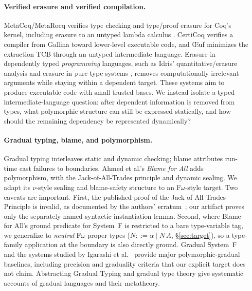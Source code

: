 \documentclass[acmsmall,anonymous=false,nonacm]{acmart}
\begin{document}
\paragraph{Verified erasure and verified compilation.}
MetaCoq/MetaRocq verifies type checking and type/proof erasure for Coq's kernel,
including erasure to an untyped lambda calculus
\cite{sozeau2020metacoq,sozeau2020coqcoqcorrect}.
CertiCoq \cite{anand2017certicoq} verifies a compiler from Gallina toward
lower-level executable code, and \OE{}uf \cite{mullen2018oeuf} minimizes the
extraction TCB through an untyped intermediate language.  Erasure in dependently
typed \emph{programming} languages, such as Idris'
quantitative/erasure analysis \cite{brady2013idris,tejiscak2020erasure} and
erasure in pure type systems \cite{mishra2008erasure}, removes computationally
irrelevant arguments while staying within a dependent target.  These systems aim
to produce executable code with small trusted bases.  We instead isolate a typed
intermediate-language question: after dependent information is removed from
types, what polymorphic structure can still be expressed statically, and how
should the remaining dependency be represented dynamically?

\paragraph{Gradual typing, blame, and polymorphism.}
Gradual typing \cite{siek2006gradual,siek2015refined} interleaves static and
dynamic checking; blame \cite{findler2002contracts,wadler2009blame} attributes
run-time cast failures to boundaries. Ahmed et al.'s \emph{Blame for All}
\cite{ahmed2011blame} adds polymorphism, with the Jack-of-All-Trades principle
and dynamic sealing. We adapt its $\nu$-style sealing and
blame-safety structure to an F$\omega$-style target.  Two caveats are important.
First, the published proof of the Jack-of-All-Trades Principle is invalid, as
documented by the authors' erratum~\cite{ahmed2011blameerratum}; our artifact
proves only the separately named syntactic instantiation lemma. Second,
where Blame for All's ground predicate for System~F is restricted to a bare
type-variable tag, we generalize to \emph{neutral} F$\omega$ proper types
($N ::= \alpha \mid N\,A$, \S\ref{sec:target}), so a type-family application at
the boundary is also directly ground. Gradual System~F
\cite{labrada2018gradualsystemf} and the systems studied by Igarashi et
al.~\cite{igarashi2017polymorphic} provide major polymorphic-gradual baselines,
including precision and graduality criteria that our explicit target does not
claim. Abstracting Gradual Typing \cite{garcia2016abstracting} and gradual type theory
\cite{new2019gradual,new2018gradualdt} give systematic accounts of gradual
languages and their metatheory.
\end{document}
